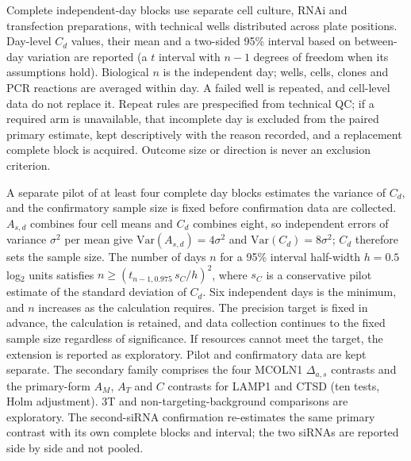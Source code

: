 Complete independent-day blocks use separate cell culture, RNAi and transfection preparations, with technical wells distributed across plate positions. Day-level $C_d$ values, their mean and a two-sided 95\% interval based on between-day variation are reported (a $t$ interval with $n-1$ degrees of freedom when its assumptions hold). Biological $n$ is the independent day; wells, cells, clones and PCR reactions are averaged within day. A failed well is repeated, and cell-level data do not replace it. Repeat rules are prespecified from technical QC; if a required arm is unavailable, that incomplete day is excluded from the paired primary estimate, kept descriptively with the reason recorded, and a replacement complete block is acquired. Outcome size or direction is never an exclusion criterion.

A separate pilot of at least four complete day blocks estimates the variance of $C_d$, and the confirmatory sample size is fixed before confirmation data are collected. $A_{s,d}$ combines four cell means and $C_d$ combines eight, so independent errors of variance $\sigma^2$ per mean give $\mathrm{Var}(A_{s,d})=4\sigma^2$ and $\mathrm{Var}(C_d)=8\sigma^2$; $C_d$ therefore sets the sample size. The number of days $n$ for a 95\% interval half-width $h=0.5$ log$_2$ units satisfies $n\ge(t_{n-1,0.975}\,s_C/h)^2$, where $s_C$ is a conservative pilot estimate of the standard deviation of $C_d$. Six independent days is the minimum, and $n$ increases as the calculation requires. The precision target is fixed in advance, the calculation is retained, and data collection continues to the fixed sample size regardless of significance. If resources cannot meet the target, the extension is reported as exploratory. Pilot and confirmatory data are kept separate. The secondary family comprises the four MCOLN1 $\Delta_{a,s}$ contrasts and the primary-form $A_M$, $A_T$ and $C$ contrasts for LAMP1 and CTSD (ten tests, Holm adjustment). 3T and non-targeting-background comparisons are exploratory. The second-siRNA confirmation re-estimates the same primary contrast with its own complete blocks and interval; the two siRNAs are reported side by side and not pooled.

